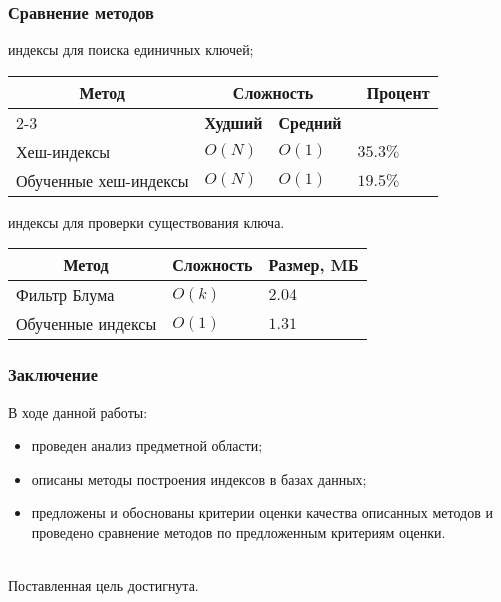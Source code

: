 \documentclass{bmstu-pr}
\begin{document}
\begin{frame}
    \frametitle{Сравнение методов}
    \begin{itemize}
{
\item индексы для поиска единичных ключей;
\captionsetup{format=hang,justification=raggedleft,
              singlelinecheck=off,width=13.3cm}
\begin{longtable}[Hc]{|p{10cm}|p{2cm}|p{2cm}|p{4.8cm}|}
    \hline
    \multicolumn{1}{|c|}{\multirow{2}{*}{\textbf{Метод}}} &
    \multicolumn{2}{c|}{\textbf{Сложность}} &
    \multicolumn{1}{c|}{\multirow{2}{*}{\parbox{4.8cm}{\centering\textbf{~Процент}}}}\\
    \cline{2-3}
    & \multicolumn{1}{c|}{\textbf{Худший}}
    & \multicolumn{1}{c|}{\textbf{Средний}}
    &\\
    \hline
    Хеш-индексы
    & $O(N)$
    & $O(1)$
    & $35.3\%$\\
    \hline
    Обученные хеш-индексы
    & $O(N)$
    & $O(1)$
    & $19.5\%$\\
    \hline
\end{longtable}
}

\item индексы для проверки существования ключа.
{
\captionsetup{format=hang,justification=raggedleft,
              singlelinecheck=off,width=12cm}
\begin{longtable}[Hc]{|p{8cm}|p{2cm}|p{2cm}|}
    \hline
    \multicolumn{1}{|c|}{\textbf{Метод}} &
    \multicolumn{1}{c|}{\textbf{Сложность}} &
    \multicolumn{1}{c|}{\textbf{Размер, MБ}}\\
    \hline
    Фильтр Блума
    & $O(k)$
    & $2.04$\\
    \hline
    Обученные индексы
    & $O(1)$
    & $1.31$\\
    \hline
\end{longtable}
}
\end{itemize}
\end{frame}

\begin{frame}
    \frametitle{Заключение}
    В ходе данной работы:
    \begin{itemize}
        \item проведен анализ предметной области;
        \item описаны методы построения индексов в базах данных;
        \item предложены и обоснованы критерии оценки качества описанных методов
          и проведено сравнение методов по предложенным критериям оценки.
    \end{itemize}
    ~\\

    Поставленная цель достигнута.
\end{frame}
\end{document}
